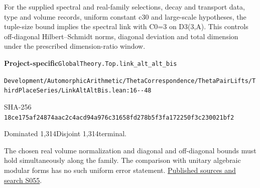 
\begin{formalstatement}[D484]\label{decomp:D484}
For the supplied spectral and real-family selections, decay and transport data, type and volume records, uniform constant c30 and large-scale hypotheses, the tuple-size bound implies the spectral link with C0=3 on D3(3,A). This controls off-diagonal Hilbert–Schmidt norms, diagonal deviation and total dimension under the prescribed dimension-ratio window.
\end{formalstatement}
{\small\raggedright\noindent\textsf{\bfseries Project-specific}\quad \nolinkurl{GlobalTheory.Top.link_alt_alt_bis}\par\noindent \nolinkurl{Development/AutomorphicArithmetic/ThetaCorrespondence/ThetaPairLifts/ThirdPlaceSeries/LinkAltAltBis.lean:16--48}\par\noindent SHA-256 \nolinkurl{18ce175af24874aac2c4acd94a976c31658fd278b5f3fa172250f3c230021bf2}\par\noindent Dominated 1,314\quad Disjoint 1,314\quad terminal.\par}
The chosen real volume normalization and diagonal and off-diagonal bounds must hold simultaneously along the family. The comparison with unitary algebraic modular forms has no such uniform error statement.
\hyperref[lit:S055]{Published sources and search S055}.
